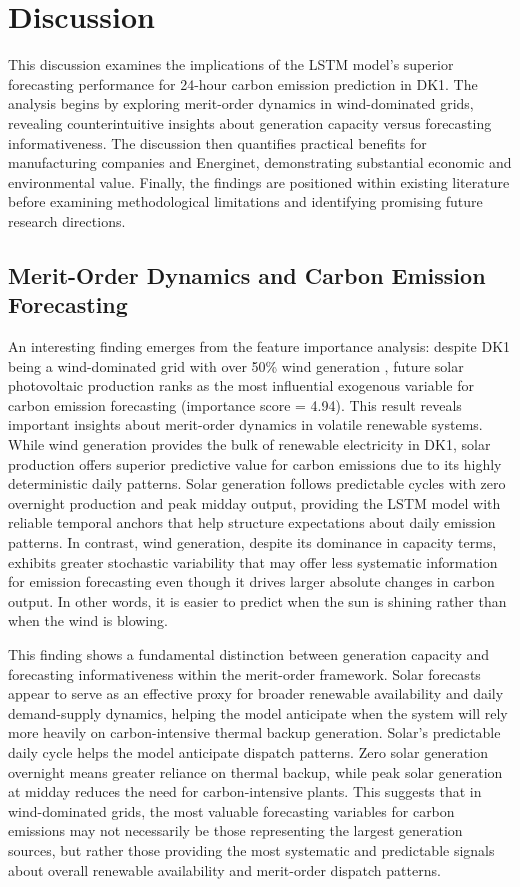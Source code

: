 \thispagestyle{plain}
\section{Discussion}

This discussion examines the implications of the LSTM model's superior forecasting performance for 24-hour carbon emission prediction in DK1. The analysis begins by exploring merit-order dynamics in wind-dominated grids, revealing counterintuitive insights about generation capacity versus forecasting informativeness. The discussion then quantifies practical benefits for manufacturing companies and Energinet, demonstrating substantial economic and environmental value. Finally, the findings are positioned within existing literature before examining methodological limitations and identifying promising future research directions.

\subsection{Merit-Order Dynamics and Carbon Emission Forecasting}

An interesting finding emerges from the feature importance analysis: despite DK1 being a wind-dominated grid with over 50\% wind generation \parencite{wang2017,iea2023}, future solar photovoltaic production ranks as the most influential exogenous variable for carbon emission forecasting (importance score = 4.94). This result reveals important insights about merit-order dynamics in volatile renewable systems. While wind generation provides the bulk of renewable electricity in DK1, solar production offers superior predictive value for carbon emissions due to its highly deterministic daily patterns. Solar generation follows predictable cycles with zero overnight production and peak midday output, providing the LSTM model with reliable temporal anchors that help structure expectations about daily emission patterns. In contrast, wind generation, despite its dominance in capacity terms, exhibits greater stochastic variability that may offer less systematic information for emission forecasting even though it drives larger absolute changes in carbon output. In other words, it is easier to predict when the sun is shining rather than when the wind is blowing.

This finding shows a fundamental distinction between generation capacity and forecasting informativeness within the merit-order framework. Solar forecasts appear to serve as an effective proxy for broader renewable availability and daily demand-supply dynamics, helping the model anticipate when the system will rely more heavily on carbon-intensive thermal backup generation. Solar's predictable daily cycle helps the model anticipate dispatch patterns. Zero solar generation overnight means greater reliance on thermal backup, while peak solar generation at midday reduces the need for carbon-intensive plants. This suggests that in wind-dominated grids, the most valuable forecasting variables for carbon emissions may not necessarily be those representing the largest generation sources, but rather those providing the most systematic and predictable signals about overall renewable availability and merit-order dispatch patterns.

